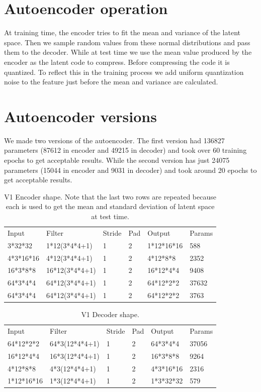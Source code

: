 \documentclass[10pt]{article}
\begin{document}
\section{Autoencoder operation}
At training time, the encoder tries to fit the mean and variance of the latent space. Then we sample random values from these normal distributions and pass them to the decoder. While at test time we use the mean value produced by the encoder as the latent code to compress. Before compressing the code it is quantized. To reflect this in the training process we add uniform quantization noise to the feature just before the mean and variance are calculated.

\section{Autoencoder versions}
We made two versions of the autoencoder. The first version had 136827 parameters (87612 in encoder and 49215 in decoder) and took over 60 training epochs to get acceptable results. While the second version has just 24075 parameters (15044 in encoder and 9031 in decoder) and took around 20 epochs to get acceptable results.

\begin{table}
\begin{tabular}{|l|l|l|l|l|l|}
Input & Filter & Stride & Pad & Output & Params\\
3*32*32		&1*12(3*4*4+1)		&1	&2	&1*12*16*16	&588\\
4*3*16*16	&4*12(3*4*4+1)		&1	&2	&4*12*8*8		&2352\\
16*3*8*8	&16*12(3*4*4+1)	&1	&2	&16*12*4*4	&9408\\
64*3*4*4	&64*12(3*4*4+1)	&1	&2	&64*12*2*2	&37632\\
64*3*4*4	&64*12(3*4*4+1)	&1	&2	&64*12*2*2	&3763\\
\end{tabular}
\caption{\label{tab:table-name}V1 Encoder shape. Note that the last two rows are repeated because each is used to get the mean and standard deviation of latent space at test time.}
\end{table}

\begin{table}
\begin{tabular}{|l|l|l|l|l|l|}
Input & Filter & Stride & Pad & Output & Params\\
64*12*2*2		&64*3(12*4*4+1)	&1	&2	&64*3*4*4		&37056\\
16*12*4*4		&16*3(12*4*4+1)	&1	&2	&16*3*8*8		&9264\\
4*12*8*8		&4*3(12*4*4+1)		&1	&2	&4*3*16*16	&2316\\
1*12*16*16	&1*3(12*4*4+1)		&1	&2	&1*3*32*32	&579\\
\end{tabular}
\caption{\label{tab:table-name}V1 Decoder shape.}
\end{table}
\end{document}
